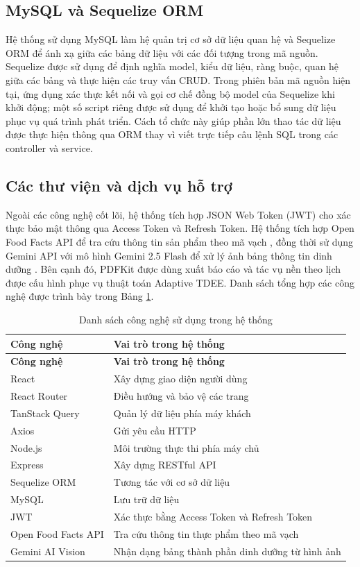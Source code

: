 \documentclass[12pt, a4paper]{report}
\begin{document}
\subsection{MySQL và Sequelize ORM}
Hệ thống sử dụng MySQL làm hệ quản trị cơ sở dữ liệu quan hệ và Sequelize ORM để ánh xạ giữa các bảng dữ liệu với các đối tượng trong mã nguồn. Sequelize được sử dụng để định nghĩa model, kiểu dữ liệu, ràng buộc, quan hệ giữa các bảng và thực hiện các truy vấn CRUD. Trong phiên bản mã nguồn hiện tại, ứng dụng xác thực kết nối và gọi cơ chế đồng bộ model của Sequelize khi khởi động; một số script riêng được sử dụng để khởi tạo hoặc bổ sung dữ liệu phục vụ quá trình phát triển. Cách tổ chức này giúp phần lớn thao tác dữ liệu được thực hiện thông qua ORM thay vì viết trực tiếp câu lệnh SQL trong các controller và service.

\subsection{Các thư viện và dịch vụ hỗ trợ}
Ngoài các công nghệ cốt lõi, hệ thống tích hợp JSON Web Token (JWT) cho xác thực bảo mật thông qua Access Token và Refresh Token. Hệ thống tích hợp Open Food Facts API để tra cứu thông tin sản phẩm theo mã vạch \cite{offApiCheatSheet}, đồng thời sử dụng Gemini API với mô hình Gemini 2.5 Flash để xử lý ảnh bảng thông tin dinh dưỡng \cite{googleGemini25Flash}. Bên cạnh đó, PDFKit được dùng xuất báo cáo và tác vụ nền theo lịch được cấu hình phục vụ thuật toán Adaptive TDEE. Danh sách tổng hợp các công nghệ được trình bày trong Bảng \ref{tab:cong_nghe_su_dung}.

\begin{longtable}{|>{\raggedright\arraybackslash}p{5cm}|p{10cm}|}
\caption{Danh sách công nghệ sử dụng trong hệ thống}
\label{tab:cong_nghe_su_dung} \\
\hline
\textbf{Công nghệ} & \textbf{Vai trò trong hệ thống} \\
\hline
\endfirsthead
\hline
\textbf{Công nghệ} & \textbf{Vai trò trong hệ thống} \\
\hline
\endhead

React & Xây dựng giao diện người dùng \\
\hline
React Router & Điều hướng và bảo vệ các trang \\
\hline
TanStack Query & Quản lý dữ liệu phía máy khách \\
\hline
Axios & Gửi yêu cầu HTTP \\
\hline
Node.js & Môi trường thực thi phía máy chủ \\
\hline
Express & Xây dựng RESTful API \\
\hline
Sequelize ORM & Tương tác với cơ sở dữ liệu \\
\hline
MySQL & Lưu trữ dữ liệu \\
\hline
JWT & Xác thực bằng Access Token và Refresh Token \\
\hline
Open Food Facts API & Tra cứu thông tin thực phẩm theo mã vạch \\
\hline
Gemini AI Vision & Nhận dạng bảng thành phần dinh dưỡng từ hình ảnh \\
\hline
\end{longtable}
\end{document}
